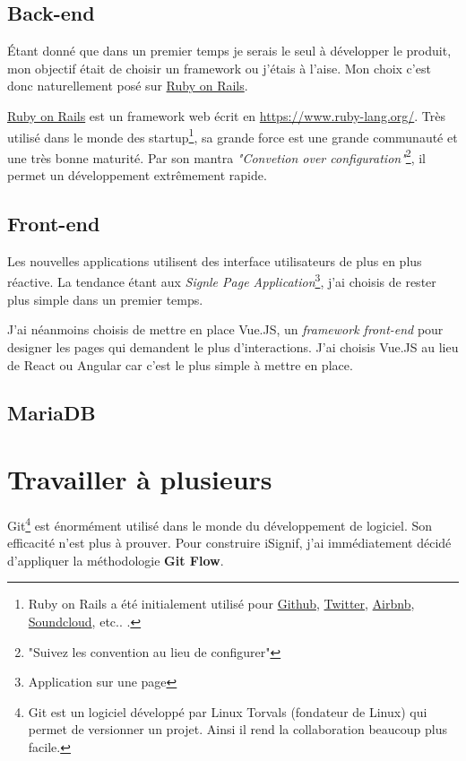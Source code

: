 \documentclass[]{report}
\begin{document}
    \subsection{Back-end}

      Étant donné que dans un premier temps je serais le seul à développer le produit, mon objectif était de choisir un framework ou j'étais à l'aise. Mon choix c'est donc naturellement posé sur \href{https://rubyonrails.org/}{Ruby on Rails}.

      \href{https://rubyonrails.org/}{Ruby on Rails} est un framework web écrit en \href{Ruby}{https://www.ruby-lang.org/}. Très utilisé dans le monde des startup\footnote{ Ruby on Rails a été initialement utilisé pour \href{https://github.com/}{Github}, \href{https://twitter.com/}{Twitter}, \href{https://airbnb.com/}{Airbnb}, \href{https://soundcloud.com/}{Soundcloud}, etc.. .}, sa grande force est une grande communauté et une très bonne maturité. Par son mantra \textit{"Convetion over configuration"}\footnote{"Suivez les convention au lieu de configurer"}, il permet un développement extrêmement rapide.

    \subsection{Front-end}

      Les nouvelles applications utilisent des interface utilisateurs de plus en plus réactive. La tendance étant aux \textit{Signle Page Application}\footnote{Application sur une page}, j'ai choisis de rester plus simple dans un premier temps.

      J'ai néanmoins choisis de mettre en place Vue.JS, un \textit{framework front-end} pour designer les pages qui demandent le plus d’interactions. J'ai choisis Vue.JS au lieu de React ou Angular car c'est le plus simple à mettre en place.

    \subsection{MariaDB}


  \section{Travailler à plusieurs}\label{sec:git}

    Git\footnote{Git est un logiciel développé par Linux Torvals (fondateur de Linux) qui permet de versionner un projet. Ainsi il rend la collaboration beaucoup plus facile.} est énormément utilisé dans le monde du développement de logiciel. Son efficacité n'est plus à prouver. Pour construire iSignif, j'ai immédiatement décidé d'appliquer la méthodologie \textbf{Git Flow}.
\end{document}
